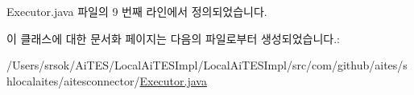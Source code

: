Executor.\+java 파일의 9 번째 라인에서 정의되었습니다.



이 클래스에 대한 문서화 페이지는 다음의 파일로부터 생성되었습니다.\+:\begin{DoxyCompactItemize}
\item 
/\+Users/srsok/\+Ai\+T\+E\+S/\+Local\+Ai\+T\+E\+S\+Impl/\+Local\+Ai\+T\+E\+S\+Impl/src/com/github/aites/shlocalaites/aitesconnector/\mbox{\hyperlink{_executor_8java}{Executor.\+java}}\end{DoxyCompactItemize}
